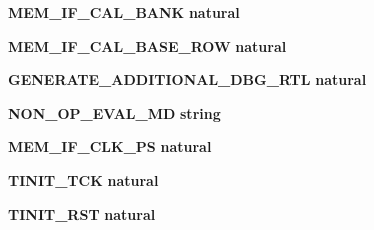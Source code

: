 \begin{DoxyCompactItemize}
\item 
{\bf M\+E\+M\+\_\+\+I\+F\+\_\+\+C\+A\+L\+\_\+\+B\+A\+NK} {\bfseries {\bfseries \textcolor{comment}{natural}\textcolor{vhdlchar}{ }}}
\item 
{\bf M\+E\+M\+\_\+\+I\+F\+\_\+\+C\+A\+L\+\_\+\+B\+A\+S\+E\+\_\+\+R\+OW} {\bfseries {\bfseries \textcolor{comment}{natural}\textcolor{vhdlchar}{ }}}
\item 
{\bf G\+E\+N\+E\+R\+A\+T\+E\+\_\+\+A\+D\+D\+I\+T\+I\+O\+N\+A\+L\+\_\+\+D\+B\+G\+\_\+\+R\+TL} {\bfseries {\bfseries \textcolor{comment}{natural}\textcolor{vhdlchar}{ }}}
\item 
{\bf N\+O\+N\+\_\+\+O\+P\+\_\+\+E\+V\+A\+L\+\_\+\+MD} {\bfseries {\bfseries \textcolor{comment}{string}\textcolor{vhdlchar}{ }}}
\item 
{\bf M\+E\+M\+\_\+\+I\+F\+\_\+\+C\+L\+K\+\_\+\+PS} {\bfseries {\bfseries \textcolor{comment}{natural}\textcolor{vhdlchar}{ }}}
\item 
{\bf T\+I\+N\+I\+T\+\_\+\+T\+CK} {\bfseries {\bfseries \textcolor{comment}{natural}\textcolor{vhdlchar}{ }}}
\item 
{\bf T\+I\+N\+I\+T\+\_\+\+R\+ST} {\bfseries {\bfseries \textcolor{comment}{natural}\textcolor{vhdlchar}{ }}}
\end{DoxyCompactItemize}
